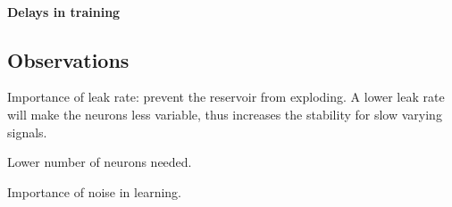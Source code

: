 \documentclass[11pt]{article}
\begin{document}
    \paragraph{Delays in training}


  \subsection{Observations}
    Importance of leak rate: prevent the reservoir from exploding. A lower leak rate will make the neurons less variable, thus increases the stability for slow varying signals.

    Lower number of neurons needed.

    Importance of noise in learning.
\end{document}
